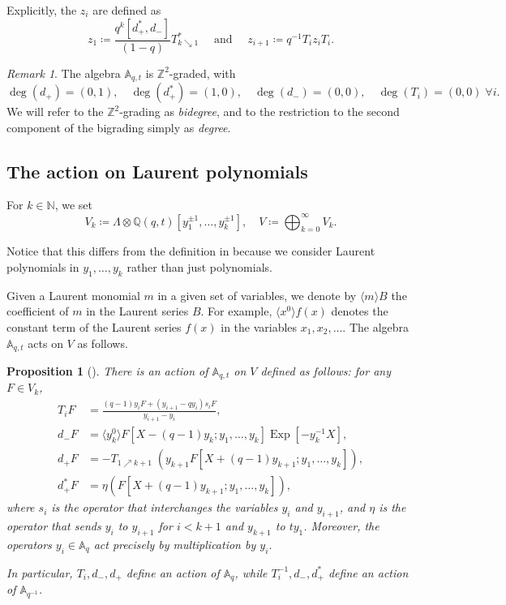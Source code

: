 \documentclass[reqno]{amsart}
\theoremstyle{plain}
\newtheorem{proposition}[theorem]{Proposition}
\theoremstyle{definition}
\theoremstyle{remark}
\newtheorem{remark}[theorem]{Remark}
\DeclareMathOperator{\Exp}{Exp}
\newcommand{\N}{\mathbb{N}}
\newcommand{\Q}{\mathbb{Q}}
\newcommand{\A}{\mathbb{A}}%
\newcommand{\<}{\langle}
\renewcommand{\>}{\rangle}
\begin{document}
Explicitly, the $z_i$ are defined as
\[ z_1 \coloneqq \frac{q^k [d_+^*,d_-]}{(1-q)}T_{k \searrow 1}^* \quad \text{ and } \quad z_{i+1} \coloneqq q^{-1} T_i z_i T_i. \]

\begin{remark}
    The algebra $\A_{q,t}$ is $\mathbb{Z}^2$-graded, with
    \[ \deg(d_+) = (0,1), \quad \deg(d_+^*) = (1,0), \quad \deg(d_-) = (0,0), \quad \deg(T_i) = (0,0) \; \forall i. \]
    We will refer to the $\mathbb{Z}^2$-grading as \emph{bidegree}, and to the restriction to the second component of the bigrading simply as \emph{degree}.
\end{remark}


\subsection{The action on Laurent polynomials}

For $k \in \N$, we set 
\[ V_k \coloneqq \Lambda \otimes \Q(q,t)[y_1^{\pm 1}, \dots, y_k^{\pm 1}], \quad V \coloneqq \bigoplus_{k=0}^\infty V_k. \]

Notice that this differs from the definition in \cites{CarlssonMellit2018ShuffleConjecture, Mellit2021Rational} because we consider Laurent polynomials in $y_1, \dots, y_k$ rather than just polynomials. 

Given a Laurent monomial $m$ in a given set of variables, we denote by $\langle m \rangle B$ the coefficient of $m$ in the Laurent series $B$. For example, $\langle x^0\rangle f(x)$ denotes the constant term of the Laurent series $f(x)$ in the variables $x_1,x_2,\dots$. The algebra $\A_{q,t}$ acts on $V$ as follows.

\begin{proposition}[{\cite[Propositions~3.3 and 3.4]{Mellit2021Rational}}]
    There is an action of $\A_{q,t}$ on $V$ defined as follows: for any $F\in V_k$,
    \begin{align}
        T_i F & = \frac{(q-1) y_i F + (y_{i+1} - q y_i) s_i F}{y_{i+1} - y_i}, \\
        d_- F & = \langle y_k^0 \rangle F[X - (q-1) y_k;y_1,\ldots,y_k] \Exp[-y_k^{-1} X], \\
        d_+ F & = -T_{1 \nearrow k+1}\; (y_{k+1} F[X+(q-1) y_{k+1}; y_1, \ldots, y_k]), \\
        d_+^* F & = \eta\left(F[X + (q-1) y_{k+1}; y_1, \ldots, y_k]\right),
    \end{align}
    where $s_i$ is the operator that interchanges the variables $y_i$ and $y_{i+1}$, and $\eta$ is the operator that sends $y_i$ to $y_{i+1}$ for $i<k+1$ and $y_{k+1}$ to $t y_1$. Moreover, the operators $y_i \in \A_q$ act precisely by multiplication by $y_i$.

    In particular, $T_i, d_-, d_+$ define an action of $\A_q$, while $T_i^{-1}, d_-, d_+^*$ define an action of $\A_{q^{-1}}$.
\end{proposition}
\end{document}
